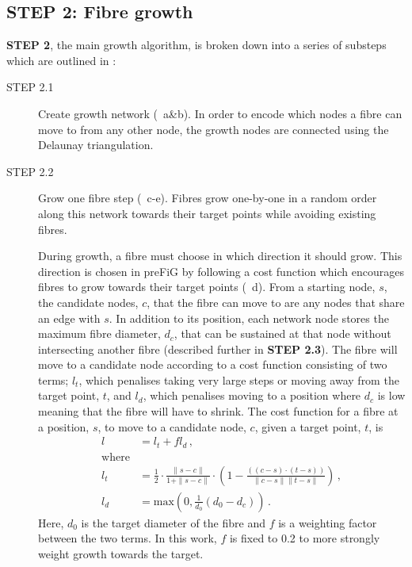 \subsection{STEP 2: Fibre growth}
\label{sec:ipmi_step2_growth}
\textbf{\sffamily STEP 2}, the main growth algorithm, is broken down into a series of substeps which are outlined in :
\begin{description}
  \item [STEP 2.1] Create growth network (~a\&b). In order to encode which nodes a fibre can move to from any other node, the growth nodes are connected using the Delaunay triangulation.

  \item [STEP 2.2] Grow one fibre step (~c-e). Fibres grow one-by-one in a random order along this network towards their target points while avoiding existing fibres.

    During growth, a fibre must choose in which direction it should grow. This direction is chosen in \ac{preFiG} by following a cost function which encourages fibres to grow towards their target points (~d).
From a starting node, $s$, the candidate nodes, $c$, that the fibre can move to are any nodes that share an edge with $s$. In addition to its position, each network node stores the maximum fibre diameter, $d_c$, that can be sustained at that node without intersecting another fibre (described further in \textbf{\sffamily STEP 2.3}). The fibre will move to a candidate node according to a cost function consisting of two terms; $l_t$, which penalises taking very large steps or moving away from the target point, $t$, and $l_d$, which penalises moving to a position where $d_c$ is low meaning that the fibre will have to shrink. The cost function for a fibre at a position, $s$, to move to a candidate node, $c$, given a target point, $t$, is
\begin{align}
  l &= l_t+fl_d  \,,\label{eq:ipmi_original_cost}\\
      \mathrm{where}\nonumber\\
  l_t &=  \frac{1}{2} \cdot \frac{\|s-c\|}{1+ \|s-c\|} \cdot \left(1- \frac{\left(\left(c-s\right) \cdot \left(t-s\right)\right)}{\|c-s\|\|t-s\|}\right)\,, \label{eq:ipmi_original_lt}\\
  l_d &=\mathrm{max}\left(0, \frac{1}{d_0} \left(d_0 - d_c \right)\right) \,. \label{eq:ipmi_original_ld}
\end{align}
Here, $d_0$ is the target diameter of the fibre and $f$ is a weighting factor between the two terms. In this work, $f$ is fixed to 0.2 to more strongly weight growth towards the target.


\end{description}

